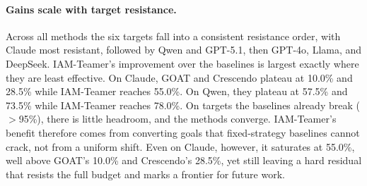 \paragraph{Gains scale with target resistance.}
Across all methods the six targets fall into a consistent resistance order, with Claude most resistant, followed by Qwen and GPT-5.1, then GPT-4o, Llama, and DeepSeek.
IAM-Teamer's improvement over the baselines is largest exactly where they are least effective.
On Claude, GOAT and Crescendo plateau at 10.0\% and 28.5\% while IAM-Teamer reaches 55.0\%.
On Qwen, they plateau at 57.5\% and 73.5\% while IAM-Teamer reaches 78.0\%.
On targets the baselines already break ($>$95\%), there is little headroom, and the methods converge.
IAM-Teamer's benefit therefore comes from converting goals that fixed-strategy baselines cannot crack, not from a uniform shift.
Even on Claude, however, it saturates at 55.0\%, well above GOAT's 10.0\% and Crescendo's 28.5\%, yet still leaving a hard residual that resists the full budget and marks a frontier for future work.

